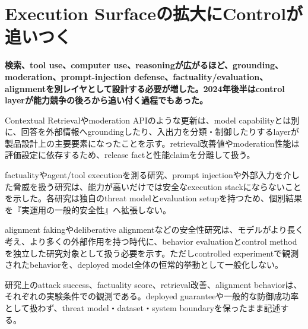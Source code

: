 \section{Execution Surfaceの拡大にControlが追いつく}
\label{pkg:control-evaluation}
\noindent\textbf{検索、tool use、computer use、reasoningが広がるほど、grounding、moderation、prompt-injection defense、factuality/evaluation、alignmentを別レイヤとして設計する必要が増した。2024年後半はcontrol layerが能力競争の後ろから追い付く過程でもあった。}\autocite{src-308d34e54e69,src-33d811167435}

Contextual Retrievalやmoderation APIのような更新は、model capabilityとは別に、回答を外部情報へgroundingしたり、入出力を分類・制御したりするlayerが製品設計上の主要要素になったことを示す。retrieval改善値やmoderation性能は評価設定に依存するため、release factと性能claimを分離して扱う。\autocite{src-308d34e54e69,src-33d811167435}


factualityやagent/tool executionを測る研究、prompt injectionや外部入力を介した脅威を扱う研究は、能力が高いだけでは安全なexecution stackにならないことを示した。各研究は独自のthreat modelとevaluation setupを持つため、個別結果を『実運用の一般的安全性』へ拡張しない。\autocite{src-e7b786f4a622,src-f96e45232e1f}


alignment fakingやdeliberative alignmentなどの安全性研究は、モデルがより長く考え、より多くの外部作用を持つ時代に、behavior evaluationとcontrol methodを独立した研究対象として扱う必要を示す。ただしcontrolled experimentで観測されたbehaviorを、deployed model全体の恒常的挙動として一般化しない。\autocite{src-3278a129a17e,src-9cf289b414fd,src-e92e95daf8e0}


\begin{claimboundary}
研究上のattack success、factuality score、retrieval改善、alignment behaviorは、それぞれの実験条件での観測である。deployed guaranteeや一般的な防御成功率として扱わず、threat model・dataset・system boundaryを保ったまま記述する。\autocite{src-e7b786f4a622}
\end{claimboundary}
